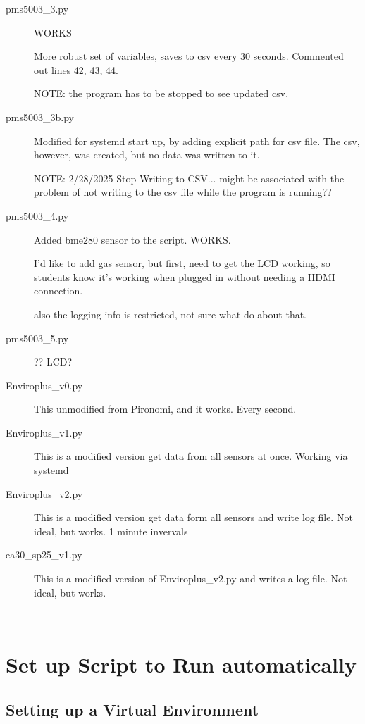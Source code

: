 \documentclass{article}
\begin{document}
\begin{description}

\item[pms5003\_3.py] WORKS

More robust set of variables, saves to csv every 30 seconds. Commented out lines 42, 43, 44.

NOTE: the program has to be stopped to see updated csv. 

\item[pms5003\_3b.py] Modified for systemd start up, by adding explicit path for csv file. The csv, however, was created, but no data was written to it.


NOTE: 2/28/2025 Stop Writing to CSV... might be associated with the problem of not writing to the csv file while the program is running??


\item[pms5003\_4.py] Added bme280 sensor to the script. WORKS.

I'd like to add gas sensor, but first, need to get the LCD working, so students know
it's working when plugged in without needing a HDMI connection. 

also the logging info is restricted, not sure what do about that.


\item[pms5003\_5.py] ?? LCD?

\item[Enviroplus\_v0.py] This unmodified from Pironomi, and it works. Every second.
  
  
\item[Enviroplus\_v1.py] This is a modified version get data from all sensors at once. Working via systemd

\item[Enviroplus\_v2.py] This is a modified version get data form all sensors and write log file. Not ideal, but works. 1 minute invervals

\item[ea30\_sp25\_v1.py] This is a modified version of Enviroplus\_v2.py and writes a log file. Not ideal, but works.   

\end{description}

\


\section{Set up Script to Run automatically}

\subsection{Setting up a Virtual Environment}
\end{document}

